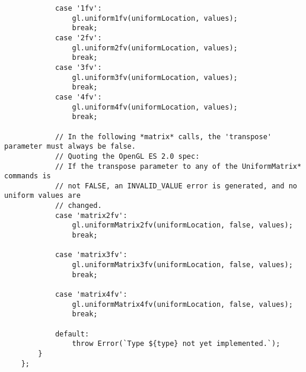 \begin{lstlisting}
            case '1fv':
                gl.uniform1fv(uniformLocation, values);
                break;
            case '2fv':
                gl.uniform2fv(uniformLocation, values);
                break;
            case '3fv':
                gl.uniform3fv(uniformLocation, values);
                break;
            case '4fv':
                gl.uniform4fv(uniformLocation, values);
                break;
    
            // In the following *matrix* calls, the 'transpose' parameter must always be false. 
            // Quoting the OpenGL ES 2.0 spec:
            // If the transpose parameter to any of the UniformMatrix* commands is
            // not FALSE, an INVALID_VALUE error is generated, and no uniform values are
            // changed.
            case 'matrix2fv':
                gl.uniformMatrix2fv(uniformLocation, false, values);
                break;
    
            case 'matrix3fv':
                gl.uniformMatrix3fv(uniformLocation, false, values);
                break;
    
            case 'matrix4fv':
                gl.uniformMatrix4fv(uniformLocation, false, values);
                break;
    
            default:
                throw Error(`Type ${type} not yet implemented.`);
        }
    };
    

\end{lstlisting}
